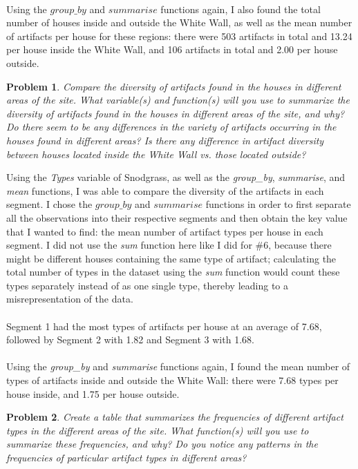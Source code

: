 \documentclass[12pt]{article}
\newtheorem{problem}{Problem}
\begin{document}
     \\
     Using the $group\_by$ and $summarise$ functions again, I also found the total number of houses inside and outside the White Wall, as well as the mean number of artifacts per house for these regions: there were 503 artifacts in total and 13.24 per house inside the White Wall, and 106 artifacts in total and 2.00 per house outside.
 \color{black}
 \begin{problem}
     Compare the diversity of artifacts found in the houses in different areas of the site. What
variable(s) and function(s) will you use to summarize the diversity of artifacts found in the
houses in different areas of the site, and why? Do there seem to be any differences in the
variety of artifacts occurring in the houses found in different areas? Is there any difference in
artifact diversity between houses located inside the White Wall vs. those located outside?
 \end{problem}
 \color{nr}
 Using the \textit{Types} variable of Snodgrass, as well as the \textit{group\_by}, \textit{summarise}, and \textit{mean} functions, I was able to compare the diversity of the artifacts in each segment. I chose the $group\_by$ and $summarise$ functions in order to first separate all the observations into their respective segments and then obtain the key value that I wanted to find: the mean number of artifact types per house in each segment. I did not use the \textit{sum} function here like I did for \#6, because there might be different houses containing the same type of artifact; calculating the total number of types in the dataset using the \textit{sum} function would count these types separately instead of as one single type, thereby leading to a misrepresentation of the data.\\
 \\
 Segment 1 had the most types of artifacts per house at an average of 7.68, followed by Segment 2 with 1.82 and Segment 3 with 1.68.\\
 \\
 Using the \textit{group\_by} and \textit{summarise} functions again, I found the mean number of types of artifacts inside and outside the White Wall: there were 7.68 types per house inside, and 1.75 per house outside.
 \color{black}
 \begin{problem}
     Create a table that summarizes the frequencies of different artifact types in the different areas
of the site. What function(s) will you use to summarize these frequencies, and why? Do you
notice any patterns in the frequencies of particular artifact types in different areas?
 \end{problem}
\end{document}
